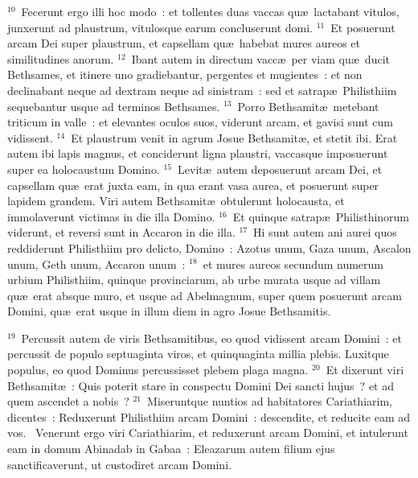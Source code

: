 ${}^{10}$~Fecerunt ergo illi hoc modo~: et tollentes duas vaccas qu\ae\ lactabant vitulos, junxerunt ad plaustrum, vitulosque earum concluserunt domi.
${}^{11}$~Et posuerunt arcam Dei super plaustrum, et capsellam qu\ae\ habebat mures aureos et similitudines anorum.
${}^{12}$~Ibant autem in directum vacc\ae\ per viam qu\ae\ ducit Bethsames, et itinere uno gradiebantur, pergentes et mugientes~: et non declinabant neque ad dextram neque ad sinistram~: sed et satrap\ae\ Philisthiim sequebantur usque ad terminos Bethsames.
${}^{13}$~Porro Bethsamit\ae\ metebant triticum in valle~: et elevantes oculos suos, viderunt arcam, et gavisi sunt cum vidissent.
${}^{14}$~Et plaustrum venit in agrum Josue Bethsamit\ae , et stetit ibi. Erat autem ibi lapis magnus, et conciderunt ligna plaustri, vaccasque imposuerunt super ea holocaustum Domino.
${}^{15}$~Levit\ae\ autem deposuerunt arcam Dei, et capsellam qu\ae\ erat juxta eam, in qua erant vasa aurea, et posuerunt super lapidem grandem. Viri autem Bethsamit\ae\ obtulerunt holocausta, et immolaverunt victimas in die illa Domino.
${}^{16}$~Et quinque satrap\ae\ Philisthinorum viderunt, et reversi sunt in Accaron in die illa.
${}^{17}$~Hi sunt autem ani aurei quos reddiderunt Philisthiim pro delicto, Domino~: Azotus unum, Gaza unum, Ascalon unum, Geth unum, Accaron unum~:
${}^{18}$~et mures aureos secundum numerum urbium Philisthiim, quinque provinciarum, ab urbe murata usque ad villam qu\ae\ erat absque muro, et usque ad Abelmagnum, super quem posuerunt arcam Domini, qu\ae\ erat usque in illum diem in agro Josue Bethsamitis.


${}^{19}$~Percussit autem de viris Bethsamitibus, eo quod vidissent arcam Domini~: et percussit de populo septuaginta viros, et quinquaginta millia plebis. Luxitque populus, eo quod Dominus percussisset plebem plaga magna.
${}^{20}$~Et dixerunt viri Bethsamit\ae~: Quis poterit stare in conspectu Domini Dei sancti hujus~? et ad quem ascendet a nobis~?
${}^{21}$~Miseruntque nuntios ad habitatores Cariathiarim, dicentes~: Reduxerunt Philisthiim arcam Domini~: descendite, et reducite eam ad vos.
~\lettrine[lines=10,image=true,loversize=0.05,lraise=-0.03]{V}{}enerunt ergo viri Cariathiarim, et reduxerunt arcam Domini, et intulerunt eam in domum Abinadab in Gabaa~: Eleazarum autem filium ejus sanctificaverunt, ut custodiret arcam Domini.


